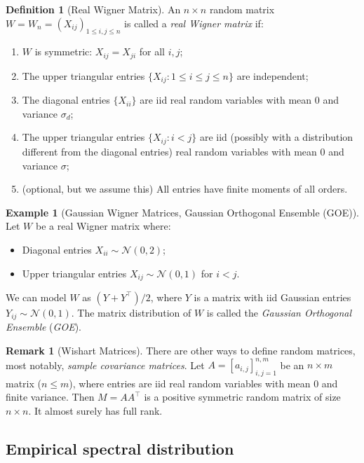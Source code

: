 \documentclass[letterpaper,11pt,oneside,reqno]{article}
\numberwithin{equation}{section}
\theoremstyle{definition}
\newtheorem{definition}[proposition]{Definition}
\newtheorem{remark}[proposition]{Remark}
\newtheorem{example}[proposition]{Example}
\begin{document}
\begin{definition}[Real Wigner Matrix]
An $n \times n$ random matrix $W=W_n = (X_{ij})_{1 \leq i,j \leq n}$ is called a \emph{real Wigner matrix} if:
\begin{enumerate}
    \item $W$ is symmetric: $X_{ij} = X_{ji}$ for all $i,j$;
    \item The upper triangular entries $\{X_{ij}: 1 \leq i \leq j \leq n\}$ are independent;
    \item The diagonal entries $\{X_{ii}\}$ are iid real random variables with mean $0$ and variance $\sigma_d$;
    \item The upper triangular entries $\{X_{ij}: i < j\}$ are iid
			(possibly with a distribution different from the diagonal entries) real random variables
			with mean $0$ and variance $\sigma$;
		\item (optional, but we assume this) All entries have finite moments of all orders.
\end{enumerate}
\end{definition}

\begin{example}[Gaussian Wigner Matrices, Gaussian Orthogonal Ensemble (GOE)]
Let $W$ be a real Wigner matrix where:
\begin{itemize}
    \item Diagonal entries $X_{ii} \sim \mathcal{N}(0, 2)$;
		\item Upper triangular entries $X_{ij} \sim \mathcal{N}(0, 1)$ for $i < j$.
\end{itemize}
We can model $W$ as $(Y+Y^\top)/2$,
where $Y$ is a matrix with iid Gaussian entries $Y_{ij} \sim \mathcal{N}(0, 1)$.
The matrix distribution of $W$ is called
the \emph{Gaussian Orthogonal Ensemble} (\emph{GOE}).
\end{example}

\begin{remark}[Wishart Matrices]
	\label{rmk:wishart-matrices}
	There are other ways to define random matrices,
	most notably, \emph{sample covariance matrices}.
	Let $A = [a_{i,j}]_{i,j=1}^{n,m}$ be an $n \times m$ matrix ($n \leq m$), where entries are iid real random variables with 
	mean $0$ and finite variance.
	Then $M = AA^\top$ is a positive symmetric random matrix of 
	size $n \times n$. It almost surely has full rank.
\end{remark}


\subsection{Empirical spectral distribution}
\end{document}
